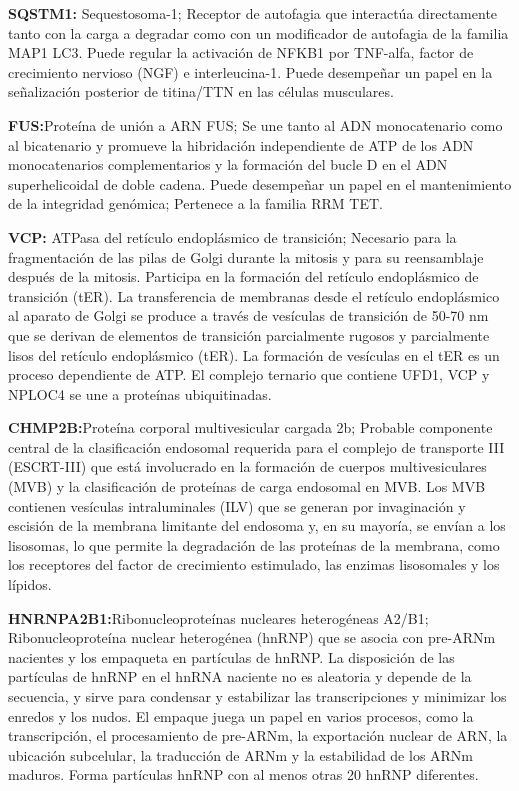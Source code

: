 \textbf{SQSTM1\cite{SQSTM1}:} Sequestosoma-1; Receptor de autofagia que interactúa directamente tanto con la carga a degradar como con un modificador de autofagia de la familia MAP1 LC3. Puede regular la activación de NFKB1 por TNF-alfa, factor de crecimiento nervioso (NGF) e interleucina-1. Puede desempeñar un papel en la señalización posterior de titina/TTN en las células musculares.

\hfill

\textbf{FUS\cite{FUS}:}Proteína de unión a ARN FUS; Se une tanto al ADN monocatenario como al bicatenario y promueve la hibridación independiente de ATP de los ADN monocatenarios complementarios y la formación del bucle D en el ADN superhelicoidal de doble cadena. Puede desempeñar un papel en el mantenimiento de la integridad genómica; Pertenece a la familia RRM TET.

\hfill

\textbf{VCP\cite{VCP}:} ATPasa del retículo endoplásmico de transición; Necesario para la fragmentación de las pilas de Golgi durante la mitosis y para su reensamblaje después de la mitosis. Participa en la formación del retículo endoplásmico de transición (tER). La transferencia de membranas desde el retículo endoplásmico al aparato de Golgi se produce a través de vesículas de transición de 50-70 nm que se derivan de elementos de transición parcialmente rugosos y parcialmente lisos del retículo endoplásmico (tER). La formación de vesículas en el tER es un proceso dependiente de ATP. El complejo ternario que contiene UFD1, VCP y NPLOC4 se une a proteínas ubiquitinadas.

\hfill

\textbf{CHMP2B\cite{CHMP2B}:}Proteína corporal multivesicular cargada 2b; Probable componente central de la clasificación endosomal requerida para el complejo de transporte III (ESCRT-III) que está involucrado en la formación de cuerpos multivesiculares (MVB) y la clasificación de proteínas de carga endosomal en MVB. Los MVB contienen vesículas intraluminales (ILV) que se generan por invaginación y escisión de la membrana limitante del endosoma y, en su mayoría, se envían a los lisosomas, lo que permite la degradación de las proteínas de la membrana, como los receptores del factor de crecimiento estimulado, las enzimas lisosomales y los lípidos.

\hfill

\textbf{HNRNPA2B1\cite{HNRNPA2B1}:}Ribonucleoproteínas nucleares heterogéneas A2/B1; Ribonucleoproteína nuclear heterogénea (hnRNP) que se asocia con pre-ARNm nacientes y los empaqueta en partículas de hnRNP. La disposición de las partículas de hnRNP en el hnRNA naciente no es aleatoria y depende de la secuencia, y sirve para condensar y estabilizar las transcripciones y minimizar los enredos y los nudos. El empaque juega un papel en varios procesos, como la transcripción, el procesamiento de pre-ARNm, la exportación nuclear de ARN, la ubicación subcelular, la traducción de ARNm y la estabilidad de los ARNm maduros. Forma partículas hnRNP con al menos otras 20 hnRNP diferentes.

\newpage